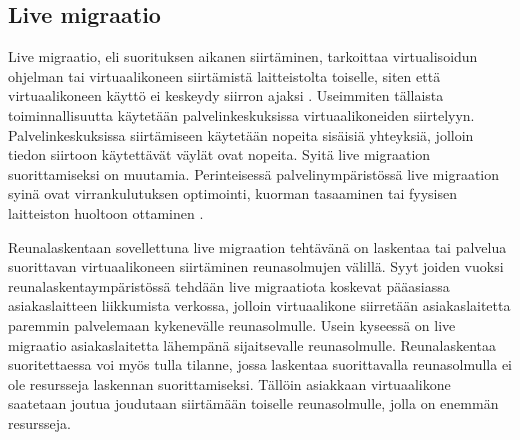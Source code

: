 \subsection{Live migraatio} \label{livemigraatio}

Live migraatio, eli suorituksen aikanen siirtäminen, tarkoittaa virtualisoidun ohjelman tai virtuaalikoneen siirtämistä laitteistolta toiselle, siten että virtuaalikoneen käyttö ei keskeydy siirron ajaksi \cite{clark2005live}. 
Useimmiten tällaista toiminnallisuutta käytetään palvelinkeskuksissa virtuaalikoneiden
siirtelyyn. Palvelinkeskuksissa siirtämiseen käytetään nopeita sisäisiä yhteyksiä,
jolloin tiedon siirtoon käytettävät väylät ovat nopeita. Syitä live migraation
suorittamiseksi on muutamia. Perinteisessä palvelinympäristössä live migraation
syinä ovat virrankulutuksen optimointi, kuorman tasaaminen tai fyysisen
laitteiston huoltoon ottaminen \cite{soni2013comparative}. 

Reunalaskentaan sovellettuna live migraation tehtävänä on laskentaa tai palvelua suorittavan virtuaalikoneen siirtäminen reunasolmujen välillä.
Syyt joiden vuoksi reunalaskentaympäristössä tehdään live migraatiota koskevat pääasiassa asiakaslaitteen liikkumista verkossa, jolloin virtuaalikone siirretään asiakaslaitetta paremmin palvelemaan kykenevälle reunasolmulle. 
Usein kyseessä on live migraatio asiakaslaitetta lähempänä sijaitsevalle reunasolmulle.
Reunalaskentaa suoritettaessa voi myös tulla tilanne, jossa laskentaa suorittavalla reunasolmulla ei ole resursseja laskennan suorittamiseksi. Tällöin asiakkaan virtuaalikone saatetaan joutua joudutaan siirtämään toiselle reunasolmulle, jolla on enemmän resursseja.  


